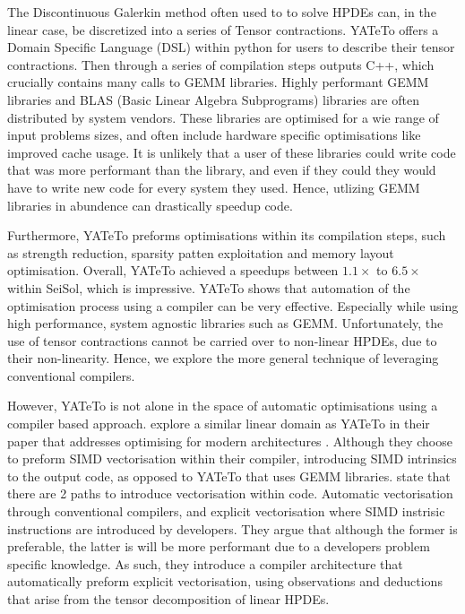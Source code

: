 The Discontinuous Galerkin method often used to to solve HPDEs can, in the linear case, be discretized into a series of Tensor contractions.
YATeTo offers a Domain Specific Language (DSL) within python for users to describe their tensor contractions.
Then through a series of compilation steps outputs C++, which crucially contains many calls to GEMM libraries.
Highly performant GEMM libraries and BLAS (Basic Linear Algebra Subprograms) libraries are often distributed by system vendors.
These libraries are optimised for a wie range of input problems sizes, and often include hardware specific optimisations like improved cache usage.
It is unlikely that a user of these libraries could write code that was more performant than the library, and even if they could they would have to write new code for every system they used.
Hence, utlizing GEMM libraries in abundence can drastically speedup code.

Furthermore, YATeTo preforms optimisations within its compilation steps, such as strength reduction, sparsity patten exploitation and memory layout optimisation.
Overall, YATeTo achieved a speedups between $1.1\times$ to $6.5 \times$ within SeiSol, which is impressive.
YATeTo shows that automation of the optimisation process using a compiler can be very effective.
Especially while using high performance, system agnostic libraries such as GEMM.
Unfortunately, the use of tensor contractions cannot be carried over to non-linear HPDEs, due to their non-linearity.
Hence, we explore the more general technique of leveraging conventional compilers.   





However, YATeTo is not alone in the space of automatic optimisations using a compiler based approach.
\citeauthor{codegen_dg_SIMD} explore a similar linear domain as YATeTo in their paper that addresses optimising for modern architectures \cite{codegen_dg_SIMD}. 
Although they choose to preform SIMD vectorisation within their compiler, introducing SIMD intrinsics to the output code, as opposed to YATeTo that uses GEMM libraries.
\citeauthor{codegen_dg_SIMD} state that there are 2 paths to introduce vectorisation within code.
Automatic vectorisation through conventional compilers, and explicit vectorisation where SIMD instrisic instructions are introduced by developers.
They argue that although the former is preferable, the latter is will be more performant due to a developers problem specific knowledge.
As such, they introduce a compiler architecture that automatically preform explicit vectorisation, using observations and deductions that arise from the tensor decomposition of linear HPDEs.

